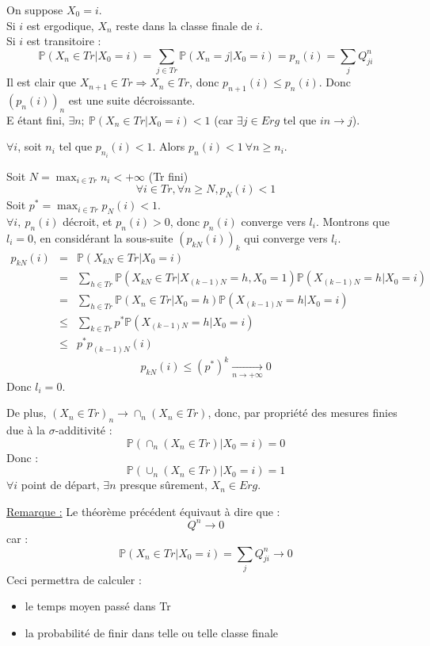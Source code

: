\begin{dem}
On suppose $X_0=i$. \\
Si $i$ est ergodique, $X_n$ reste dans la classe finale de $i$.\\
Si $i$ est transitoire :
\[\mathbb{P}(X_n\in Tr|X_0=i)=\sum_{j\in Tr} \mathbb{P}(X_n=j|X_0=i)=p_n(i)=\sum_j Q_{ji}^n\]
Il est clair que $X_{n+1}\in Tr \Rightarrow X_n\in Tr$, donc $p_{n+1}(i)\leq p_n(i)$. Donc $(p_n(i))_n$ est une suite décroissante.\\
E étant fini, $\exists n;\ \mathbb{P}(X_n\in Tr | X_0=i)<1$ (car $\exists j\in Erg$ tel que $in\to j$). 

\bigskip
$\forall i$, soit $n_i$ tel que $p_{n_i}(i)<1$. Alors $p_n(i)<1\ \forall n\geq n_i$. 

\bigskip
Soit $N=\max_{i\in Tr} n_i<+\infty$ (Tr fini)
\[\forall i\in Tr, \forall n\geq N, p_N(i)<1\]
Soit $p^*=\max_{i\in Tr} p_N(i)<1$. \\
$\forall i,\ p_n(i)$ décroit, et $p_n(i)>0$, donc $p_n(i)$ converge vers $l_i$. Montrons que $l_i=0$, en considérant la sous-suite $(p_{kN}(i))_k$ qui converge vers $l_i$. 
\begin{eqnarray*}
p_{kN}(i) &=& \mathbb{P}(X_{kN}\in Tr | X_0=i) \\
	&=& \sum_{h\in Tr} \mathbb{P}(X_{kN}\in Tr | X_{(k-1)N}=h, X_0=1)\mathbb{P}(X_{(k-1)N}=h|X_0=i) \\
	&=& \sum_{h\in Tr} \mathbb{P}(X_n\in Tr | X_0=h)\mathbb{P}(X_{(k-1)N}=h | X_0=i)\\
	&\leq& \sum_{k \in Tr} p^* \mathbb{P}(X_{(k-1)N}=h | X_0=i)\\
	&\leq& p^*p_{(k-1)N}(i)
\end{eqnarray*}
\[p_{kN}(i)\leq (p^*)^k \xrightarrow[n\to +\infty]{} 0\]
Donc $l_i=0$.

\bigskip
De plus, $(X_n\in Tr)_n \rightarrow \cap_n (X_n\in Tr)$, donc, par propriété des mesures finies due à la $\sigma$-additivité :
\[\mathbb{P}(\cap_n(X_n\in Tr)|X_0=i)=0\]
Donc :
\[\mathbb{P}(\cup_n(X_n\in Tr)|X_0=i)=1\]
$\forall i$ point de départ, $\exists n$ presque sûrement, $X_n\in Erg$. 
\end{dem}

\underline{Remarque :} Le théorème précédent équivaut à dire que :
\[Q^n\rightarrow 0\]
car :
\[\mathbb{P}(X_n\in Tr | X_0=i)=\sum_j Q^n_{ji} \to 0\]
Ceci permettra de calculer :
\begin{itemize}
	\item le temps moyen passé dans Tr
	\item la probabilité de finir dans telle ou telle classe finale
\end{itemize}

